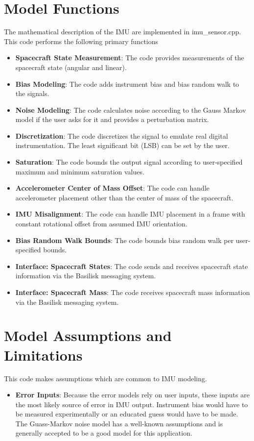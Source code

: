 \section{Model Functions}
The mathematical description of the IMU are implemented in imu\_sensor.cpp. This code performs the following primary functions
\begin{itemize}
	\item \textbf{Spacecraft State Measurement}: The code provides measurements of the spacecraft state (angular and linear).
	\item \textbf{Bias Modeling}: The code adds instrument bias and bias random walk to the signals.
	\item \textbf{Noise Modeling}: The code calculates noise according to the Gauss Markov model if the user asks for it and provides a perturbation matrix.
	\item \textbf{Discretization}: The code discretizes the signal to emulate real digital instrumentation. The least significant bit (LSB) can be set by the user.
	\item \textbf{Saturation}: The code bounds the output signal according to user-specified maximum and minimum saturation values.
	\item \textbf{Accelerometer Center of Mass Offset}: The code can handle accelerometer placement other than the center of mass of the spacecraft.
	\item \textbf{IMU Misalignment}: The code can handle IMU placement in a frame with constant rotational offset from assumed IMU orientation.
	\item \textbf{Bias Random Walk Bounds}: The code bounds bias random walk per user-specified bounds.
	\item \textbf{Interface: Spacecraft States}: The code sends and receives spacecraft state information via the Basilisk messaging system.
	\item \textbf{Interface: Spacecraft Mass}: The code receives spacecraft mass information via the Basilisk messaging system.
\end{itemize}


\section{Model Assumptions and Limitations}
This code makes assumptions which are common to IMU modeling.
\begin{itemize}
	\item \textbf{Error Inputs}: Because the error models rely on user inputs, these inputs are the most likely source of error in IMU output. Instrument bias would have to be measured experimentally or an educated guess would have to be made. The Guass-Markov noise model has a well-known assumptions and is generally accepted to be a good model for this application.
\end{itemize}